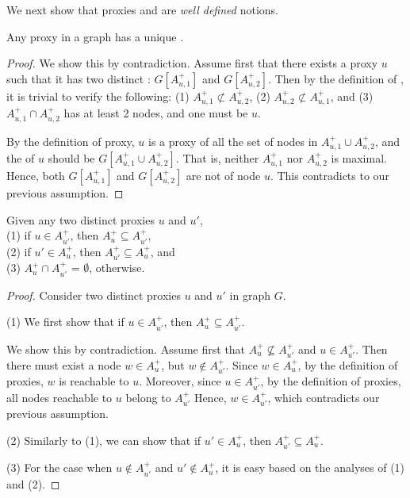 We next show that proxies and \dras are {\em well defined} notions.


\begin{prop}
\label{prop-proxy-unique-dra} Any proxy in a graph has a unique \dra.
\end{prop}

\begin{proof}
We show this by contradiction. Assume first that there exists a proxy $u$ such that it has two distinct \dras: $G[A^+_{u,1}]$ and $G[A^+_{u,2}]$.
Then by the definition of \dra, it is trivial to verify the following:
%
\sstab(1) $A^+_{u,1}\not\subset A^+_{u,2}$,
\sstab(2) $A^+_{u,2}\not\subset A^+_{u,1}$, and
\sstab(3) $A^+_{u,1}\cap A^+_{u,2}$ has at least 2 nodes, and one must be $u$.

By the definition of proxy, $u$ is a proxy of all the set of nodes in $A^+_{u,1}\cup A^+_{u,2}$, and the \dra of $u$ should be $G[A^+_{u,1}\cup A^+_{u,2}]$. That is, neither $A^+_{u,1}$ nor $A^+_{u,2}$ is maximal. Hence, both $G[A^+_{u,1}]$ and $G[A^+_{u,2}]$ are not \dras of node $u$.
This contradicts to our previous assumption.
\end{proof}

\begin{prop}
\label{thm-proxy-disjoint} Given any two distinct proxies $u$ and $u'$, \\
(1) if $u\in A^+_{u'}$, then $A^+_{u}\subseteq A^+_{u'}$, \\
(2) if $u'\in A^+_{u}$, then $A^+_{u'}\subseteq A^+_{u}$,  and \\
(3) $A^+_{u}\cap A^+_{u'}$ = $\emptyset$, otherwise.
\end{prop}

\begin{proof}
Consider two distinct proxies $u$ and $u'$ in graph $G$.


(1) We first show that if $u\in A^+_{u'}$, then $A^+_{u}\subseteq A^+_{u'}$.

We show this by contradiction. Assume first that $A^+_{u}\not\subseteq A^+_{u'}$ and $u\in A^+_{u'}$.
Then there must exist a node $w\in A^+_{u}$, but $w\not\in A^+_{u'}$.
%
Since $w\in A^+_{u}$, by the definition of proxies, $w$ is reachable to $u$.
Moreover, since $u\in A^+_{u'}$, by the definition of proxies, all nodes reachable to $u$ belong to  $A^+_{u'}$
Hence, $w\in A^+_{u'}$, which contradicts our previous assumption.

(2) Similarly to (1), we can show that if $u'\in A^+_{u}$, then $A^+_{u'}\subseteq A^+_{u}$.

(3) For the case when $u\not\in A^+_{u'}$ and $u'\not\in A^+_{u}$, it is easy based on the analyses of (1) and (2).
\end{proof}

